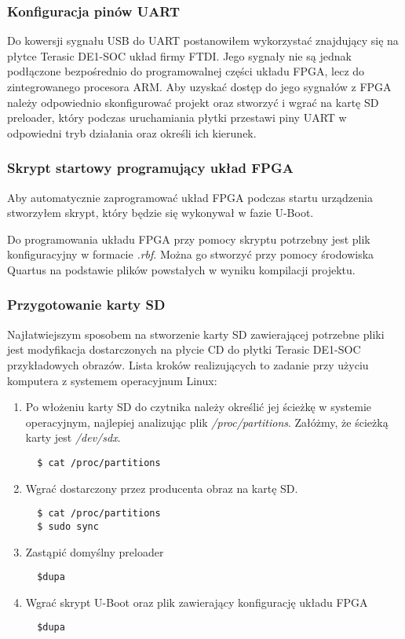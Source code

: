 \subsubsection{Konfiguracja pinów UART}
Do kowersji sygnału USB do UART postanowiłem wykorzystać znajdujący się na płytce Terasic DE1-SOC układ firmy FTDI. Jego sygnały nie są jednak podłączone bezpośrednio do programowalnej części układu FPGA, lecz do zintegrowanego procesora ARM. Aby uzyskać dostęp do jego sygnałów z FPGA należy odpowiednio skonfigurować projekt oraz stworzyć i wgrać na kartę SD preloader, który podczas uruchamiania płytki przestawi piny UART w odpowiedni tryb działania oraz określi ich kierunek.

\subsubsection{Skrypt startowy programujący układ FPGA}
Aby automatycznie zaprogramować układ FPGA podczas startu urządzenia stworzyłem skrypt, który będzie się wykonywał w fazie U-Boot.

Do programowania układu FPGA przy pomocy skryptu potrzebny jest plik konfiguracyjny w formacie \textit{.rbf}. Można go stworzyć przy pomocy środowiska Quartus na podstawie plików powstałych w wyniku kompilacji projektu.

\subsubsection{Przygotowanie karty SD}
Najłatwiejszym sposobem na stworzenie karty SD zawierającej potrzebne pliki jest modyfikacja dostarczonych na płycie CD do płytki Terasic DE1-SOC przykładowych obrazów. Lista kroków realizujących to zadanie przy użyciu komputera z systemem operacyjnum Linux:
\begin{enumerate}
\item Po włożeniu karty SD do czytnika należy określić jej ścieżkę w systemie operacyjnym, najlepiej analizując plik \textit{/proc/partitions}. Załóżmy, że ścieżką karty jest \textit{/dev/sdx}.
\begin{lstlisting}
  $ cat /proc/partitions
\end{lstlisting}

\item Wgrać dostarczony przez producenta obraz na kartę SD\cite{rocketboards-booting-prebuild}.
\begin{lstlisting}
  $ cat /proc/partitions
  $ sudo sync
\end{lstlisting}

\item Zastąpić domyślny preloader
\begin{lstlisting}
  $dupa
\end{lstlisting}

\item Wgrać skrypt U-Boot oraz plik zawierający konfigurację układu FPGA
\begin{lstlisting}
  $dupa
\end{lstlisting}



\end{enumerate}


\newpage